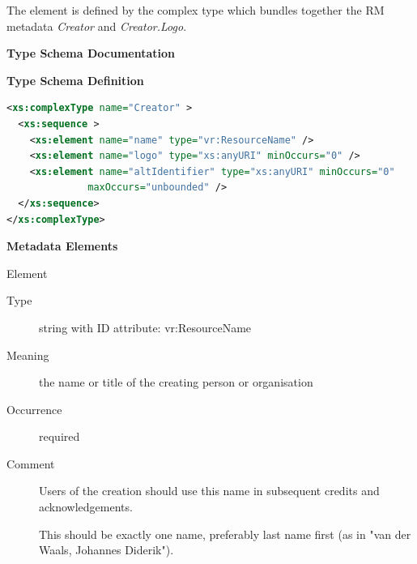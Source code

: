 \documentclass[11pt,a4paper]{ivoa}
\begin{document}


The  element is defined by the  complex
type which bundles together the RM metadata \emph{Creator} and
\emph{Creator.Logo}.



\begin{generated}
\begingroup
      	\renewcommand*\descriptionlabel[1]{%
      	\hbox to 5.5em{\emph{#1}\hfil}}\vspace{2ex}\noindent\textbf{ Type Schema Documentation}


\vspace{1ex}\noindent\textbf{ Type Schema Definition}

\begin{lstlisting}[language=XML,basicstyle=\footnotesize]
<xs:complexType name="Creator" >
  <xs:sequence >
    <xs:element name="name" type="vr:ResourceName" />
    <xs:element name="logo" type="xs:anyURI" minOccurs="0" />
    <xs:element name="altIdentifier" type="xs:anyURI" minOccurs="0"
              maxOccurs="unbounded" />
  </xs:sequence>
</xs:complexType>
\end{lstlisting}

\vspace{0.5ex}\noindent\textbf{ Metadata Elements}

\begingroup\small\begin{bigdescription}\item[Element \xmlel{name}]
\begin{description}
\item[Type] string with ID attribute: vr:ResourceName
\item[Meaning] 
                  the name or title of the creating person or organisation
              
\item[Occurrence] required
\item[Comment] 
                  Users of the creation should use this name in
                  subsequent credits and acknowledgements.

                  This should be exactly one name, preferably last name
                  first (as in {"}van der Waals, Johannes Diderik{"}).
              


\end{description}
\end{bigdescription}
\end{generated}
\end{document}
